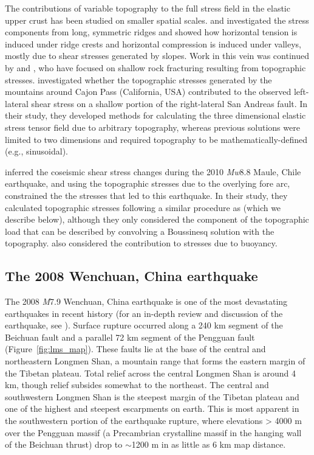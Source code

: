 \documentclass[draft,jgrga]{AGUTeX}
\begin{document}
\begin{article}
The contributions of variable topography to the full stress field in the
elastic upper crust has been studied on smaller spatial scales.
\citet{mctiguemei1981} and \citet{savageswolfs1986} investigated the stress
components from long, symmetric ridges and showed how horizontal tension is
induced under ridge crests and horizontal compression is induced under valleys,
mostly due to shear stresses generated by slopes. Work in this vein was
continued by \citet{millerdunne1996} and \citet{martel2006}, who have focused
on shallow rock fracturing resulting from topographic stresses.
\citet{liuzoback1992} investigated whether the topographic stresses generated
by the mountains around Cajon Pass (California, USA) contributed to the
observed left-lateral shear stress on a shallow portion of the right-lateral
San Andreas fault. In their study, they developed methods for calculating the
three dimensional elastic stress tensor field due to 
arbitrary topography, whereas
previous solutions were limited to two dimensions and required topography to be
mathematically-defined (e.g., sinusoidal).

\citet{luttrell2011} inferred the coseismic shear stress changes during the
2010 \emph{Mw}8.8 Maule, Chile earthquake, and using the topographic stresses
due to the overlying fore arc, constrained the the stresses that led to this
earthquake. In their study, they calculated topographic stresses following a
similar procedure as \citet{liuzoback1992} (which we describe below), although
they only considered the component of the topographic load that can be
described by convolving a Boussinesq solution with the topography.
\citet{luttrell2011} also considered the contribution to stresses due to
buoyancy.

\subsection{The 2008 Wenchuan, China
earthquake}\label{the-2008-wenchuan-china-earthquake}

The 2008 \emph{M}7.9 Wenchuan, China earthquake is one of the most devastating
earthquakes in recent history (for an in-depth review and discussion of the
earthquake, see \citet{zhang2010}).  Surface rupture occurred along a 240 km
segment of the Beichuan fault and a parallel 72 km segment of the Pengguan
fault \citep{xu2009} (Figure~\ref{fig:lms_map}). These faults lie at the base
of the central and northeastern Longmen Shan, a mountain range that forms the
eastern margin of the Tibetan plateau. Total relief across the central Longmen
Shan is around 4 km, though relief subsides somewhat to the northeast.  The
central and southwestern Longmen Shan is the steepest margin of the Tibetan
plateau \citep{clarkroyden2000} and one of the highest and steepest escarpments
on earth. This is most apparent in the southwestern portion of the earthquake
rupture, where elevations \textgreater{} 4000 m over the Pengguan massif (a
Precambrian crystalline massif in the hanging wall of the Beichuan thrust) drop
to $\sim$1200 m in as little as 6 km map distance.


\end{article}
\end{document}
